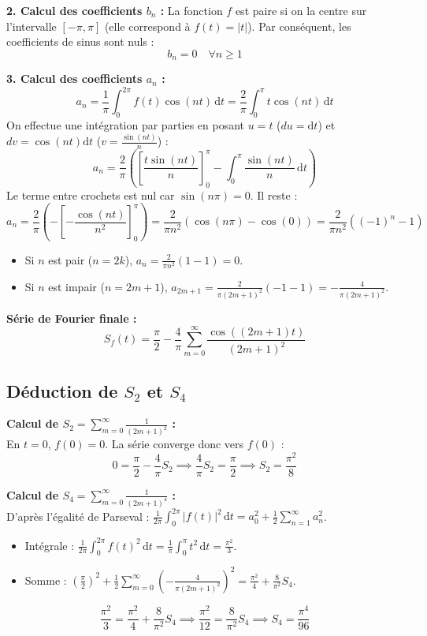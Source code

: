 \documentclass[french]{yLectureNote}
\newcommand{\dd}{\mathrm{d}}
\begin{document}
\textbf{2. Calcul des coefficients $b_n$ :}
La fonction $f$ est paire si on la centre sur l'intervalle $[-\pi, \pi]$ (elle correspond à $f(t) = |t|$). Par conséquent, les coefficients de sinus sont nuls :
\[
b_n = 0 \quad \forall n \ge 1
\]

\textbf{3. Calcul des coefficients $a_n$ :}
\[
a_n = \frac{1}{\pi} \int_{0}^{2\pi} f(t) \cos(nt) \, \dd t = \frac{2}{\pi} \int_{0}^{\pi} t \cos(nt) \, \dd t
\]
On effectue une intégration par parties en posant $u = t$ ($du = \dd t$) et $dv = \cos(nt)\dd t$ ($v = \frac{\sin(nt)}{n}$) :
\[
a_n = \frac{2}{\pi} \left( \left[ \frac{t \sin(nt)}{n} \right]_0^\pi - \int_{0}^{\pi} \frac{\sin(nt)}{n} \, \dd t \right)
\]
Le terme entre crochets est nul car $\sin(n\pi) = 0$. Il reste :
\[
a_n = \frac{2}{\pi} \left( - \left[ -\frac{\cos(nt)}{n^2} \right]_0^\pi \right) = \frac{2}{\pi n^2} (\cos(n\pi) - \cos(0)) = \frac{2}{\pi n^2} ((-1)^n - 1)
\]
\begin{itemize}
    \item Si $n$ est pair ($n=2k$), $a_n = \frac{2}{\pi n^2}(1 - 1) = 0$.
    \item Si $n$ est impair ($n=2m+1$), $a_{2m+1} = \frac{2}{\pi (2m+1)^2}(-1 - 1) = -\frac{4}{\pi (2m+1)^2}$.
\end{itemize}

\textbf{Série de Fourier finale :}
\[
S_f(t) = \frac{\pi}{2} - \frac{4}{\pi} \sum_{m=0}^{\infty} \frac{\cos((2m+1)t)}{(2m+1)^2}
\]

\subsection{Déduction de $S_2$ et $S_4$}

\textbf{Calcul de $S_2 = \sum_{m=0}^{\infty} \frac{1}{(2m+1)^2}$ :} \\
En $t=0$, $f(0)=0$. La série converge donc vers $f(0)$ :
\[
0 = \frac{\pi}{2} - \frac{4}{\pi} S_2 \implies \frac{4}{\pi} S_2 = \frac{\pi}{2} \implies S_2 = \frac{\pi^2}{8}
\]

\textbf{Calcul de $S_4 = \sum_{m=0}^{\infty} \frac{1}{(2m+1)^4}$ :} \\
D'après l'égalité de Parseval : $\frac{1}{2\pi} \int_{0}^{2\pi} |f(t)|^2 \, \dd t = a_0^2 + \frac{1}{2} \sum_{n=1}^{\infty} a_n^2$.
\begin{itemize}
    \item Intégrale : $\frac{1}{2\pi} \int_{0}^{2\pi} f(t)^2 \, \dd t = \frac{1}{\pi} \int_{0}^{\pi} t^2 \, \dd t = \frac{\pi^2}{3}$.
    \item Somme : $\left(\frac{\pi}{2}\right)^2 + \frac{1}{2} \sum_{m=0}^{\infty} \left( -\frac{4}{\pi(2m+1)^2} \right)^2 = \frac{\pi^2}{4} + \frac{8}{\pi^2} S_4$.
\end{itemize}
\[
\frac{\pi^2}{3} = \frac{\pi^2}{4} + \frac{8}{\pi^2} S_4 \implies \frac{\pi^2}{12} = \frac{8}{\pi^2} S_4 \implies S_4 = \frac{\pi^4}{96}
\]
\end{document}
